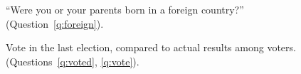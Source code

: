 \begin{figure}[h!]
    \caption[Foreign origin]{``Were you or your parents born in a foreign country?'' (Question~\ref{q:foreign}).
    }\label{fig:foreign}
\end{figure}

\begin{figure}[h!]
    \caption[Vote in the last election compared to actual results (among voters)]{Vote in the last election, compared to actual results among voters. (Questions~\ref{q:voted}, \ref{q:vote}).
    }\label{fig:vote_pnr_out}
\end{figure}

